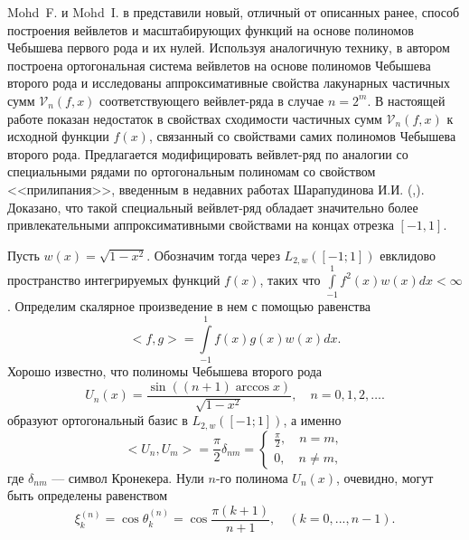 Mohd~F. и Mohd~I. в \cite{sms10}
представили новый, отличный от описанных ранее, способ построения вейвлетов и масштабирующих функций на основе полиномов Чебышева первого рода и их нулей. Используя аналогичную технику, в \cite{sms11}
автором построена ортогональная система вейвлетов на основе полиномов Чебышева второго рода и исследованы аппроксимативные свойства лакунарных частичных сумм $\mathcal{V}_n(f,x)$ соответствующего вейвлет-ряда в случае $n = 2^m$.
В настоящей работе показан недостаток в свойствах сходимости частичных сумм $\mathcal{V}_n(f,x)$ к исходной функции $f(x)$, связанный со свойствами самих полиномов Чебышева второго рода. Предлагается модифицировать вейвлет-ряд по аналогии со специальными рядами по ортогональным полиномам со свойством <<прилипания>>, введенным в недавних работах Шарапудинова И.И.
(\cite{sob-leg-sharap3},\cite{sms12}). Доказано, что такой специальный вейвлет-ряд обладает значительно более привлекательными аппроксимативными свойствами на концах отрезка $[-1, 1]$.


Пусть $w(x) = \sqrt{1-x^2}$. Обозначим тогда через $L_{2, w}([-1; 1])$ евклидово пространство интегрируемых функций $f(x)$, таких что
$\int\limits_{-1}^{1} f^2(x)w(x)dx < \infty$.
Определим скалярное произведение в нем с помощью равенства
\begin{equation}
\label{scal}
<f, g> = \int\limits_{-1}^{1} f(x) g(x) w(x) dx.
\end{equation}
Хорошо известно, что полиномы Чебышева второго рода
 \begin{equation*}
\label{u2direct}
U_n(x) = \frac{\sin((n+1)\arccos{x})}{\sqrt{1-x^2}}, \quad n = 0,1,2, \ldots .
\end{equation*}
образуют ортогональный базис в $L_{2, w}([-1; 1])$, а именно
\begin{equation}
\label{sms1ortho}
<U_n, U_m> = \frac{\pi}{2}\delta_{nm} =
\left\{
\begin{aligned}
\frac{\pi}{2}, \quad n=m,\\
0, \quad  n \neq m,
\end{aligned}
\right.
\end{equation}
где $\delta_{nm}$ --- символ Кронекера.
Нули $n$-го полинома $U_n(x)$, очевидно, могут быть определены равенством
\begin{equation*}
\label{sms1zeros}
\xi_{k}^{(n)} = \cos{\theta_{k}^{(n)}} =  \cos{\frac{\pi (k+1)}{n+1}}, \quad (k = 0,...,n-1).
\end{equation*}



